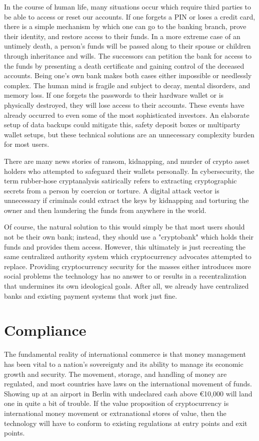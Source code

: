 In the course of human life, many situations occur which require third parties
to be able to access or reset our accounts. If one forgets a PIN or loses a
credit card, there is a simple mechanism by which one can go to the banking
branch, prove their identity, and restore access to their funds. In a more
extreme case of an untimely death, a person's funds will be passed along to
their spouse or children through inheritance and wills. The successors can
petition the bank for access to the funds by presenting a death certificate and
gaining control of the deceased accounts. Being one's own bank makes both cases
either impossible or needlessly complex. The human mind is fragile and subject
to decay, mental disorders, and memory loss. If one forgets the passwords to
their hardware wallet or is physically destroyed, they will lose access to their
accounts. These events have already occurred to even some of the most
sophisticated investors. An elaborate setup of data backups could mitigate this,
safety deposit boxes or multiparty wallet setups, but these technical solutions
are an unnecessary complexity burden for most users.

There are many news stories of ransom, kidnapping, and murder of crypto asset
holders who attempted to safeguard their wallets personally. In cybersecurity,
the term rubber-hose cryptanalysis satirically refers to extracting
cryptographic secrets from a person by coercion or torture. A digital attack
vector is unnecessary if criminals could extract the keys by kidnapping and
torturing the owner and then laundering the funds from anywhere in the world.

Of course, the natural solution to this would simply be that most users should
not be their own bank; instead, they should use a "cryptobank" which holds their
funds and provides them access. However, this ultimately is just recreating the
same centralized authority system which cryptocurrency advocates attempted to
replace. Providing cryptocurrency security for the masses either introduces more
social problems the technology has no answer to or results in a recentralization
that undermines its own ideological goals. After all, we already have
centralized banks and existing payment systems that work just fine.

\section{Compliance}

The fundamental reality of international commerce is that money management has
been vital to a nation's sovereignty and its ability to manage its economic
growth and security. The movement, storage, and handling of money are regulated,
and most countries have laws on the international movement of funds. Showing up
at an airport in Berlin with undeclared cash above €10,000 will land one in
quite a bit of trouble. If the value proposition of cryptocurrency is
international money movement or extranational stores of value, then the
technology will have to conform to existing regulations at entry points and exit
points.

